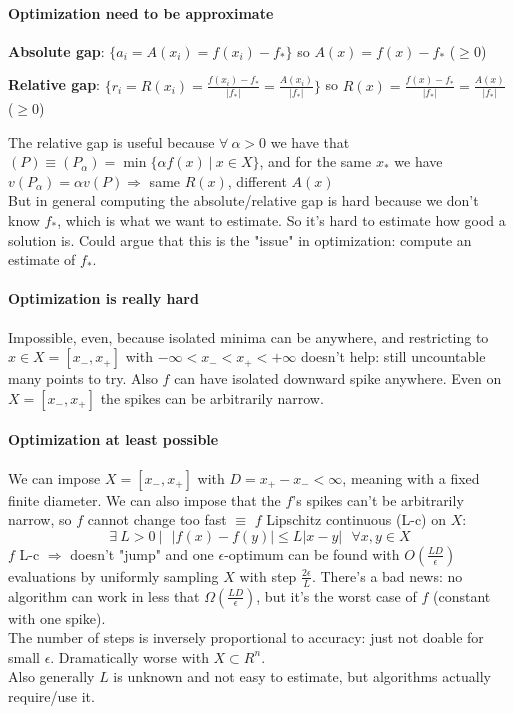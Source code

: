 \documentclass[10pt]{report}
\begin{document}
\paragraph{Optimization need to be approximate} \begin{list}{}{}
	\item \textbf{Absolute gap}: $\{a_i = A(x_i) = f(x_i) - f_*\}$ so $A(x) = f(x) - f_*$ ($\geq 0$)
	\item \textbf{Relative gap}: $\{r_i = R(x_i) = \frac{f(x_i) - f_*}{|f_*|} = \frac{A(x_i)}{|f_*|}\}$ so $R(x) = \frac{f(x) - f_*}{|f_*|} = \frac{A(x)}{|f_*|}$ ($\geq 0$)
\end{list}
The relative gap is useful because $\forall\:\alpha>0$ we have that $(P)\equiv (P_\alpha) = \min\{\alpha f(x)\:|\:x\in X\}$, and for the same $x_*$ we have $v(P_\alpha) = \alpha v(P) \Rightarrow$ same $R(x)$, different $A(x)$\\
But in general computing the absolute/relative gap is hard because we don't know $f_*$, which is what we want to estimate. So it's hard to estimate how good a solution is. Could argue that this is the "issue" in optimization: compute an estimate of $f_*$.
\paragraph{Optimization is really hard} Impossible, even, because isolated minima can be anywhere, and restricting to $x\in X=[x_-, x_+]$ with $-\infty<x_-<x_+<+\infty$ doesn't help: still uncountable many points to try. Also $f$ can have isolated downward spike anywhere. Even on $X = [x_-, x_+]$ the spikes can be arbitrarily narrow.
\paragraph{Optimization at least possible} We can impose $X=[x_-,x_+]$ with $D = x_+-x_-<\infty$, meaning with a fixed finite diameter. We can also impose that the $f$'s spikes can't be arbitrarily narrow, so $f$ cannot change too fast $\equiv$ $f$ Lipschitz continuous (L-c) on $X$: $$\exists\: L > 0\:|\:\:\:|f(x) - f(y)| \leq L|x - y|\:\:\:\forall x,y\in X$$
$f$ L-c $\Rightarrow$ doesn't "jump" and one $\epsilon$-optimum can be found with $O(\frac{LD}{\epsilon})$ evaluations by uniformly sampling $X$ with step $\frac{2\epsilon}{L}$. There's a bad news: no algorithm can work in less that $\Omega(\frac{LD}{\epsilon})$, but it's the worst case of $f$ (constant with one spike).\\
The number of steps is inversely proportional to accuracy: just not doable for small $\epsilon$. Dramatically worse with $X\subset R^n$.\\
Also generally $L$ is unknown and not easy to estimate, but algorithms actually require/use it.
\end{document}
